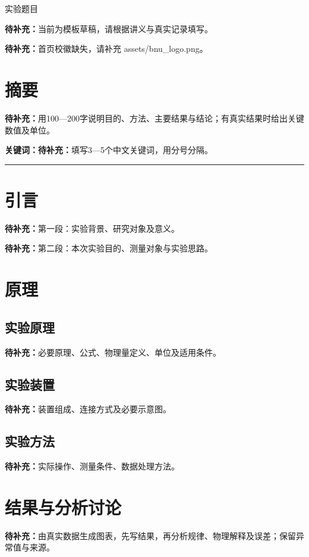 \documentclass[UTF8,a4paper,11pt,fontset=fandol,scheme=plain]{ctexart}
\title{\ReportTitle}
\author{作者：\ReportBlank{2.4cm}\quad 学号：\ReportBlank{3.0cm}\\
        指导老师：\ReportBlank{2.0cm}\quad 实验时间：\ReportBlank{2.6cm}}
\date{}
\makeatletter
\newcommand{\ReportTitle}{实验题目}
\newcommand{\ReportTODO}[1]{\textbf{待补充：}#1}
\newif\ifReportLogo
\newcommand{\ReportInfo}{\@author}
\makeatother
\begin{document}
\vspace*{12mm}\begingroup\setlength{\fboxsep}{10pt}\noindent\colorbox{ReportTint}{\parbox{\dimexpr\linewidth-2\fboxsep\relax}{\centering\heiti\fontsize{22pt}{28pt}\selectfont\ReportTitle\par}}\par\endgroup
\begin{center}\ReportInfo\end{center}
\noindent\ReportTODO{当前为模板草稿，请根据讲义与真实记录填写。}
\ifReportLogo\else
  \par\noindent\ReportTODO{首页校徽缺失，请补充 assets/bnu_logo.png。}
\fi

\section*{摘要}
\ReportTODO{用100—200字说明目的、方法、主要结果与结论；有真实结果时给出关键数值及单位。}
\par\noindent\textbf{关键词：}\ReportTODO{填写3—5个中文关键词，用分号分隔。}
{\color{ReportAccent}\hrule height 1pt}\vspace{8pt}

\section{引言}\label{sec:introduction}
\ReportTODO{第一段：实验背景、研究对象及意义。}

\ReportTODO{第二段：本次实验目的、测量对象与实验思路。}

\section{原理}\label{sec:principle}
\subsection{实验原理}
\ReportTODO{必要原理、公式、物理量定义、单位及适用条件。}
\subsection{实验装置}
\ReportTODO{装置组成、连接方式及必要示意图。}
\subsection{实验方法}
\ReportTODO{实际操作、测量条件、数据处理方法。}

\section{结果与分析讨论}\label{sec:results}
\ReportTODO{由真实数据生成图表，先写结果，再分析规律、物理解释及误差；保留异常值与来源。}
\end{document}
